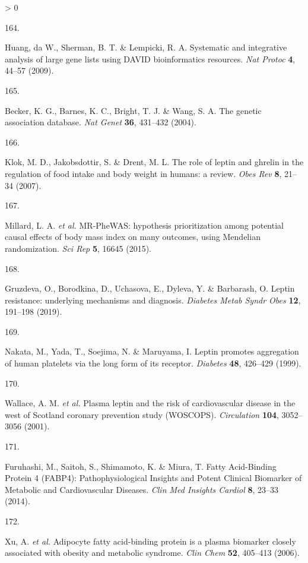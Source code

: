 \documentclass[11pt,twoside]{bristolthesis}
\newlength{\cslhangindent}
\newlength{\csllabelwidth}
\newenvironment{CSLReferences}[2] %
 {%
  \setlength{\parindent}{0pt}
  \ifodd #1 \everypar{\setlength{\hangindent}{\cslhangindent}}\ignorespaces\fi
  \ifnum #2 > 0
  \setlength{\parskip}{#2\baselineskip}
  \fi
 }%
 {}
\newcommand{\CSLLeftMargin}[1]{\parbox[t]{\csllabelwidth}{#1}}
\newcommand{\CSLRightInline}[1]{\parbox[t]{\linewidth - \csllabelwidth}{#1}\break}
\begin{document}
\begin{CSLReferences}{0}{0}
\leavevmode\hypertarget{ref-Huang2009}{}%
\CSLLeftMargin{164. }
\CSLRightInline{Huang, da W., Sherman, B. T. \& Lempicki, R. A. {Systematic and integrative analysis of large gene lists using DAVID bioinformatics resources}. \emph{Nat Protoc} \textbf{4}, 44--57 (2009).}

\leavevmode\hypertarget{ref-Becker2004a}{}%
\CSLLeftMargin{165. }
\CSLRightInline{Becker, K. G., Barnes, K. C., Bright, T. J. \& Wang, S. A. {The genetic association database}. \emph{Nat Genet} \textbf{36}, 431--432 (2004).}

\leavevmode\hypertarget{ref-Klok2007}{}%
\CSLLeftMargin{166. }
\CSLRightInline{Klok, M. D., Jakobsdottir, S. \& Drent, M. L. {The role of leptin and ghrelin in the regulation of food intake and body weight in humans: a review}. \emph{Obes Rev} \textbf{8}, 21--34 (2007).}

\leavevmode\hypertarget{ref-Millard2015}{}%
\CSLLeftMargin{167. }
\CSLRightInline{Millard, L. A. \emph{et al.} {MR-PheWAS: hypothesis prioritization among potential causal effects of body mass index on many outcomes, using Mendelian randomization}. \emph{Sci Rep} \textbf{5}, 16645 (2015).}

\leavevmode\hypertarget{ref-Gruzdeva2019a}{}%
\CSLLeftMargin{168. }
\CSLRightInline{Gruzdeva, O., Borodkina, D., Uchasova, E., Dyleva, Y. \& Barbarash, O. {Leptin resistance: underlying mechanisms and diagnosis}. \emph{Diabetes Metab Syndr Obes} \textbf{12}, 191--198 (2019).}

\leavevmode\hypertarget{ref-Nakata1999}{}%
\CSLLeftMargin{169. }
\CSLRightInline{Nakata, M., Yada, T., Soejima, N. \& Maruyama, I. {Leptin promotes aggregation of human platelets via the long form of its receptor}. \emph{Diabetes} \textbf{48}, 426--429 (1999).}

\leavevmode\hypertarget{ref-Wallace2001}{}%
\CSLLeftMargin{170. }
\CSLRightInline{Wallace, A. M. \emph{et al.} {Plasma leptin and the risk of cardiovascular disease in the west of Scotland coronary prevention study (WOSCOPS)}. \emph{Circulation} \textbf{104}, 3052--3056 (2001).}

\leavevmode\hypertarget{ref-Furuhashi2014}{}%
\CSLLeftMargin{171. }
\CSLRightInline{Furuhashi, M., Saitoh, S., Shimamoto, K. \& Miura, T. {Fatty Acid-Binding Protein 4 (FABP4): Pathophysiological Insights and Potent Clinical Biomarker of Metabolic and Cardiovascular Diseases}. \emph{Clin Med Insights Cardiol} \textbf{8}, 23--33 (2014).}

\leavevmode\hypertarget{ref-Xu2006}{}%
\CSLLeftMargin{172. }
\CSLRightInline{Xu, A. \emph{et al.} {Adipocyte fatty acid-binding protein is a plasma biomarker closely associated with obesity and metabolic syndrome}. \emph{Clin Chem} \textbf{52}, 405--413 (2006).}


\end{CSLReferences}
\end{document}
